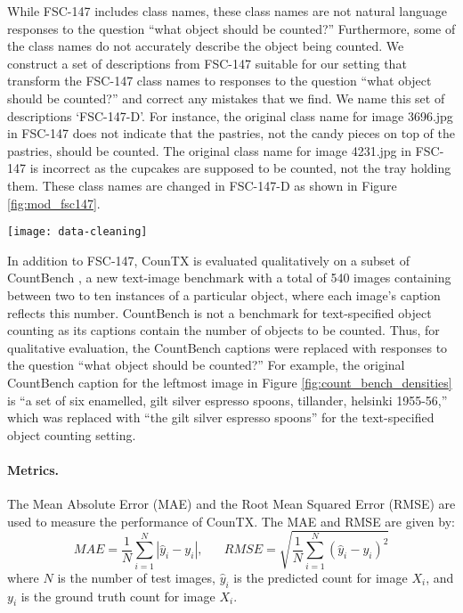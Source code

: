 \documentclass{bmvc2k}
\begin{document}
While FSC-147 includes class names, these class names are not natural language responses to the question ``what object should be counted?'' Furthermore, some of the class names do not accurately describe the object being counted. We construct a set of descriptions  from FSC-147 suitable for our setting that transform the FSC-147 class names to responses to the question ``what object should be counted?'' and correct any mistakes that we find. We name this set of descriptions `FSC-147-D'. For instance, the original class name for image 3696.jpg in FSC-147 does not indicate that the pastries, not the candy pieces on top of the pastries, should be counted. The original class name for image 4231.jpg in FSC-147 is incorrect as the cupcakes are supposed to be counted, not the tray holding them. These class names are changed in FSC-147-D as shown in Figure \ref{fig:mod_fsc147}.

\begin{figure*}[h!]
\centering
\texttt{[image: data-cleaning]}
\vspace{-7mm}
   \caption{Examples of changes made to FSC-147 to construct FSC-147-D, a dataset for the open-world text-specified object counting setting.}
\vspace{-3mm}
\label{fig:mod_fsc147}
\end{figure*}

In addition to FSC-147, CounTX is evaluated qualitatively on a subset of CountBench \cite{paiss2023countclip}, a new text-image benchmark with a total of 540 images containing between two to ten instances of a particular object, where each image's caption reflects this number. CountBench is not a benchmark for text-specified object counting as its captions contain the number of objects to be counted. Thus, for qualitative evaluation, the CountBench captions were replaced with responses to the question ``what object should be counted?'' For example, the original CountBench caption for the leftmost image in Figure \ref{fig:count_bench_densities} is ``a set of six enamelled, gilt silver espresso spoons, tillander, helsinki 1955-56,'' which was replaced with ``the gilt silver espresso spoons'' for the text-specified object counting setting.

\paragraph{Metrics.} The Mean Absolute Error (MAE) and the Root Mean Squared Error (RMSE) are used to measure the performance of CounTX. The MAE and RMSE are given by: 
\begin{equation}\label{err_forms}
    MAE = \frac{1}{N}\sum_{i = 1}^{N}|\hat{y}_{i} - y_{i}|,\quad\text{ }RMSE = \sqrt{\frac{1}{N}\sum_{i = 1}^{N}(\hat{y}_{i} - y_{i})^2}
\end{equation}
where $N$ is the number of test images, $\hat{y}_{i}$ is the predicted count for image $X_{i}$, and $y_{i}$ is the ground truth count for image $X_{i}$.
\end{document}
